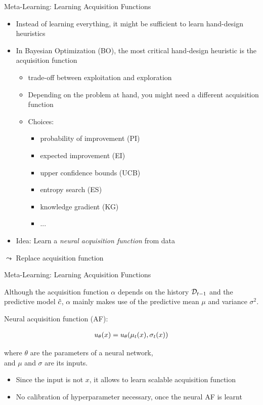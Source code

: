 \begin{frame}[c]{Meta-Learning: Learning Acquisition Functions}

\begin{itemize}
	\item Instead of learning everything, it might be sufficient to \alert{learn hand-design heuristics}
	\pause
	\item In Bayesian Optimization (BO), the most critical hand-design heuristic is the acquisition function
	\begin{itemize}
		\item trade-off between exploitation and exploration
		\item Depending on the problem at hand, you might need a different acquisition function
		\pause
		\item Choices:
		\begin{itemize}
			\item probability of improvement (PI)
			\item expected improvement (EI)
			\item upper confidence bounds (UCB)
			\item entropy search (ES) 
			\item knowledge gradient (KG)
			\item ...
		\end{itemize} 
	\end{itemize}
	\pause
	\item \alert{Idea:} Learn a \emph{neural acquisition function} from data
\end{itemize}

$\leadsto$ Replace acquisition function 


\end{frame}
\begin{frame}[c]{Meta-Learning: Learning Acquisition Functions}
	
Although the \alert{acquisition function $\alpha$} depends on the history $\mathcal{D}_{t-1}$ and the predictive model $\hat{c}$, $\alpha$ mainly makes use of the \alert{predictive mean $\mu$ and variance $\sigma^2$}.

\pause
\bigskip

Neural acquisition function (AF):

\begin{eqnarray}
u_\theta(x) = u_\theta(\mu_t(x), \sigma_t(x)) \nonumber
\end{eqnarray}

where $\theta$ are the parameters of a neural network,\\ and $\mu$ and $\sigma$ are its inputs.

\pause 
\begin{itemize}
	\item Since the input is not $x$, it allows to learn scalable acquisition function
	\item No calibration of hyperparameter necessary, once the neural AF is learnt
\end{itemize}

\end{frame}
